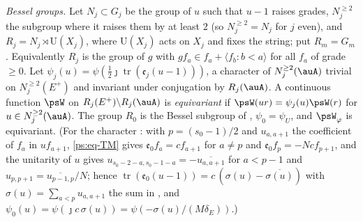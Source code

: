 \documentclass[10pt]{amsart}
\theoremstyle{definition}
\theoremstyle{remark}
\providecommand{\auU}{\mathrm U}
\providecommand{\aubar}[1]{\overline{#1}}
\begin{document}
\emph{Bessel groups.} Let $N_j\subset G_j$ be the group of $u$ such that $u-1$ raises grades,
$N_j^{\ge2}$ the subgroup where it raises them by at least $2$ (so $N_j^{\ge2}=N_j$ for $j$ even),
and $R_j=N_j\rtimes\auU(X_j)$, where $\auU(X_j)$ acts on $X_j$ and fixes the string; put
$R_m=G_m$. Equivalently $R_j$ is the group of $g$ with $gf_a\in f_a+\langle f_b:b<a\rangle$ for
all $f_a$ of grade $\ge0$. Let $\psi_j(u)=\psi(\tfrac12\jmath\operatorname{tr}(\mathfrak e_j(u-1)))$,
a character of $N_j^{\ge2}(\auA)$ trivial on $N_j^{\ge2}(E^+)$ and invariant under conjugation by
$R_j(\auA)$. A continuous function $\psW$ on $R_j(E^+)\backslash R_j(\auA)$ is
\emph{equivariant} if $\psW(ur)=\psi_j(u)\psW(r)$ for $u\in N_j^{\ge2}(\auA)$. The group $R_0$ is
the Bessel subgroup of {\cite[\S14.3]{P46}}, $\psi_0=\psi_U$, and $\psW_\varphi$ is equivariant.
(For the character {\cite[(4)]{P51}}: with $p=(s_0-1)/2$ and $u_{a,a+1}$ the coefficient of $f_a$ in
$uf_{a+1}$, \eqref{ps:eq-TM} gives $\mathfrak e_0f_a=cf_{a+1}$ for $a\ne p$ and $\mathfrak e_0f_p=-Ncf_{p+1}$,
and the unitarity of $u$ gives $u_{s_0-2-a,s_0-1-a}=-\aubar{u_{a,a+1}}$ for $a<p-1$ and
$u_{p,p+1}=\aubar{u_{p-1,p}}/N$; hence $\operatorname{tr}(\mathfrak e_0(u-1))=c\,(\sigma(u)-\aubar{\sigma(u)})$
with $\sigma(u)=\sum_{a<p}u_{a,a+1}$ the sum in {\cite[(4)]{P51}}, and $\psi_0(u)=\psi(\jmath c\,\sigma(u))=
\psi(-\sigma(u)/(M\delta_E))$.)
\end{document}
